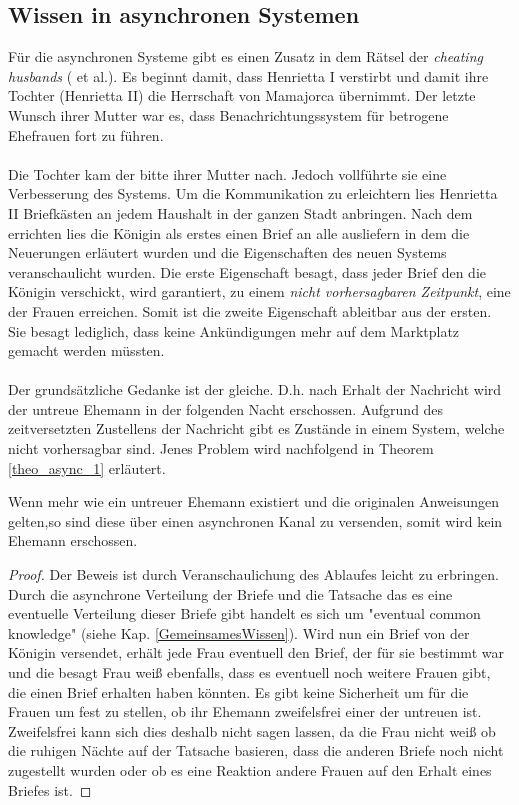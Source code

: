 \subsection{Wissen in asynchronen Systemen}
\label{wissen_sync}
Für die asynchronen Systeme gibt es einen Zusatz in dem Rätsel der \textit{cheating husbands} (\cite{moses1986cheating} et al.). Es beginnt damit, dass Henrietta I verstirbt und damit ihre Tochter (Henrietta II) die Herrschaft von Mamajorca übernimmt. Der letzte Wunsch ihrer Mutter war es, dass Benachrichtungssystem für betrogene Ehefrauen fort zu führen. \\\\
Die Tochter kam der bitte ihrer Mutter nach. Jedoch vollführte sie eine Verbesserung des Systems. Um die Kommunikation zu erleichtern lies Henrietta II Briefkästen an jedem Haushalt in der ganzen Stadt anbringen. Nach dem errichten lies die Königin als erstes einen Brief an alle ausliefern in dem die Neuerungen erläutert wurden und die Eigenschaften des neuen Systems veranschaulicht wurden. Die erste Eigenschaft besagt, dass jeder Brief den die Königin verschickt, wird garantiert, zu einem \textit{nicht vorhersagbaren Zeitpunkt}, eine der Frauen erreichen. Somit ist die zweite Eigenschaft ableitbar aus der ersten. Sie besagt lediglich, dass keine Ankündigungen mehr auf dem Marktplatz gemacht werden müssten.\\\\
Der grundsätzliche Gedanke ist der gleiche. D.h. nach Erhalt der Nachricht wird der untreue Ehemann in der folgenden Nacht erschossen. Aufgrund des zeitversetzten Zustellens der Nachricht gibt es Zustände in einem System, welche nicht vorhersagbar sind. Jenes Problem wird nachfolgend in Theorem \ref{theo_async_1} erläutert.
\begin{theorem}
\label{theo_async_1}
Wenn mehr wie ein untreuer Ehemann existiert und die originalen Anweisungen gelten,so sind  diese über einen asynchronen Kanal zu versenden, somit wird kein Ehemann erschossen.
\end{theorem}
\begin{proof}
Der Beweis ist durch Veranschaulichung des Ablaufes leicht zu erbringen. Durch die asynchrone Verteilung der Briefe und die Tatsache das es eine eventuelle Verteilung dieser Briefe gibt handelt es sich um "eventual common knowledge" (siehe Kap. \ref{GemeinsamesWissen}). Wird nun ein Brief von der Königin versendet, erhält jede Frau eventuell den Brief, der für sie bestimmt war und die besagt Frau weiß ebenfalls, dass es eventuell noch weitere Frauen gibt, die einen Brief erhalten haben könnten. Es gibt keine Sicherheit um für die Frauen um fest zu stellen, ob ihr Ehemann zweifelsfrei einer der untreuen ist. Zweifelsfrei kann sich dies deshalb nicht sagen lassen, da die Frau nicht weiß ob die ruhigen Nächte auf der Tatsache basieren, dass die anderen Briefe noch nicht zugestellt wurden oder ob es eine Reaktion andere Frauen auf den Erhalt eines Briefes ist.
\end{proof}
